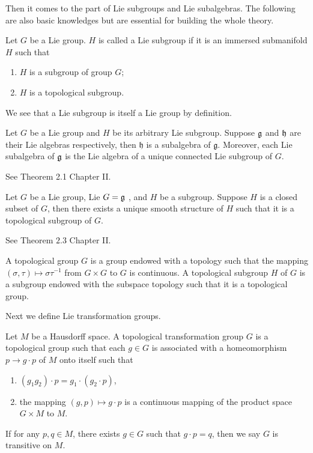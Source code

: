Then it comes to the part of Lie subgroups and Lie subalgebras.
The following are also basic knowledges but are essential for
building the whole theory.

\begin{definition}
	Let $G$ be a Lie group. $H$ is called a Lie subgroup if it is
	an immersed submanifold $H$ such that
	
  \begin{enumerate}
    \item $H$ is a subgroup of group $G$;
    
    \item $H$ is a topological subgroup.
  \end{enumerate}
\end{definition}

 We see that a Lie subgroup is itself a Lie group by definition.

\begin{theorem}
	Let $G$ be a  Lie group and $H$ be its arbitrary Lie
	subgroup. Suppose ${\mathfrak g}$ and ${\mathfrak h}$ are their Lie algebras
	respectively,
	then
	 $\mathfrak{h}$ is a subalgebra of $\mathfrak{g} .$ Moreover,
	 each Lie subalgebra of ${\mathfrak g}$ is the Lie algebra of a unique
	 connected Lie subgroup of $G$.
\end{theorem}
\bproof See \cite{Hel} Theorem 2.1 Chapter II.
\eproof
\begin{theorem}
	Let $G$ be a Lie group,  Lie $G={\mathfrak g}$ , and $H$ be a
	subgroup. Suppose $H$ is a closed subset of $G$, then there
	exists a unique smooth
	structure of ${H}$ such that it is a topological subgroup of
	$G$.
\end{theorem}
\bproof
See \cite{Hel} Theorem $2.3$ Chapter II.
\eproof

\begin{definition}
	A topological group $G$ is a group endowed with a topology
	such that the mapping $(\sigma, \tau) \mapsto \sigma
	\tau^{-1}$ from $G \times G$ to $G$ is continuous. A
	topological subgroup $H$ of $G$ is a subgroup endowed with
	the subspace topology such that it is a topological group.
\end{definition}

Next we define Lie transformation groups.
\begin{definition}
Let $M$ be a Hausdorff space. A topological transformation group
$G$ is a topological group such that each $g \in G$ is associated
with a homeomorphism $p \rightarrow g \cdot p$ of $M$ onto itself
such that

\begin{enumerate}
  \item $\left(g_{1} g_{2}\right) \cdot p=g_{1} \cdot \left( g_{2}
\cdot p \right)$,

  \item the mapping $(g, p) \mapsto g \cdot p$ is a continuous
mapping of the product space $G \times M$ to $M$.
\end{enumerate}

If for any $p, q \in M$, there exists $g \in G$ such that $g
\cdot p=q$, then we say $G$ is transitive on $M$.	
\end{definition}
